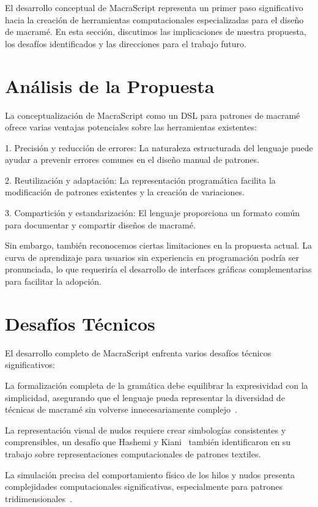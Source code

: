 \documentclass[12pt,a4paper]{report}
\begin{document}
El desarrollo conceptual de MacraScript representa un primer paso significativo hacia la creación de herramientas computacionales especializadas para el diseño de macramé. En esta sección, discutimos las implicaciones de nuestra propuesta, los desafíos identificados y las direcciones para el trabajo futuro.

\section{Análisis de la Propuesta}
La conceptualización de MacraScript como un DSL para patrones de macramé ofrece varias ventajas potenciales sobre las herramientas existentes:

1. Precisión y reducción de errores: La naturaleza estructurada del lenguaje puede ayudar a prevenir errores comunes en el diseño manual de patrones.

2. Reutilización y adaptación: La representación programática facilita la modificación de patrones existentes y la creación de variaciones.

3. Compartición y estandarización: El lenguaje proporciona un formato común para documentar y compartir diseños de macramé.

Sin embargo, también reconocemos ciertas limitaciones en la propuesta actual. La curva de aprendizaje para usuarios sin experiencia en programación podría ser pronunciada, lo que requeriría el desarrollo de interfaces gráficas complementarias para facilitar la adopción.

\section{Desafíos Técnicos}
El desarrollo completo de MacraScript enfrenta varios desafíos técnicos significativos:

La formalización completa de la gramática debe equilibrar la expresividad con la simplicidad, asegurando que el lenguaje pueda representar la diversidad de técnicas de macramé sin volverse innecesariamente complejo~\cite{mernik2005}.

La representación visual de nudos requiere crear simbologías consistentes y comprensibles, un desafío que Hashemi y Kiani~\cite{hashemi2017} también identificaron en su trabajo sobre representaciones computacionales de patrones textiles.

La simulación precisa del comportamiento físico de los hilos y nudos presenta complejidades computacionales significativas, especialmente para patrones tridimensionales~\cite{hudson2018}.
\end{document}
